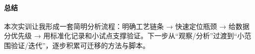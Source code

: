 \paragraph{总结} 本次实训让我形成一套简明分析流程：明确工艺链条 → 快速定位瓶颈 → 给数据分优先级 → 用标准化记录和小试点支撑验证。下一步从“观察/分析”过渡到“小范围验证/迭代”，逐步积累可迁移的方法与脚本。
